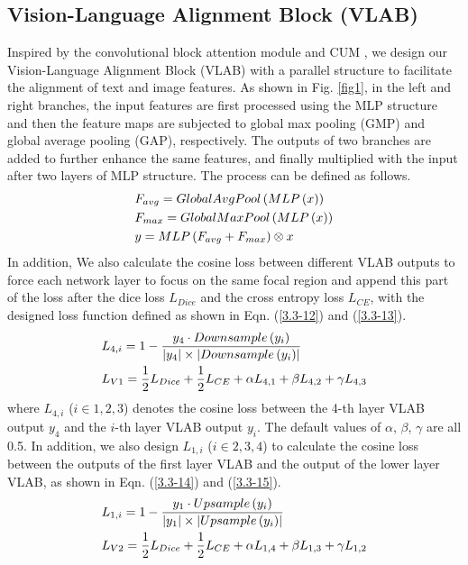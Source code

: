 \documentclass{article}
\begin{document}
\vspace{-5mm}
\subsection{Vision-Language Alignment Block (VLAB)}
\vspace{-2mm}
Inspired by the convolutional block attention module \cite{li2022tfcns} and CUM \cite{li2022semi}, we design our Vision-Language Alignment Block (VLAB) with a parallel structure to facilitate the alignment of text and image features. As shown in Fig. \ref{fig1}, in the left and right branches, the input features are first processed using the MLP structure and then the feature maps are subjected to global max pooling (GMP) and global average pooling (GAP), respectively. The outputs of two branches are added to further enhance the same features, and finally multiplied with the input after two layers of MLP structure. The process can be defined as follows.
\vspace{-2mm}
\begin{eqnarray}
\setlength{\abovedisplayskip}{0pt}
\setlength{\belowdisplayskip}{0pt}
& F_{avg}=GlobalAvgPool\left ( MLP\left (   x\right  )\right )\\
& F_{max}=GlobalMaxPool\left ( MLP\left (   x\right  )\right )\\
& y= MLP\left (F_{avg}+F_{max}\right )\otimes  x
\end{eqnarray}
In addition, We also calculate the cosine loss between different VLAB outputs to force each network layer to focus on the same focal region and append this part of the loss after the dice loss $L_{Dice}$ and the cross entropy loss $L_{CE}$, with the designed loss function defined as shown in Eqn. (\ref{3.3-12}) and (\ref{3.3-13}).
\vspace{-2mm}
\begin{eqnarray}
\setlength{\abovedisplayskip}{0pt}
\setlength{\belowdisplayskip}{0pt}
& L_{4,i}=1-\frac{y_{4}\cdot Downsample\left ( y_{i}\right ) }{\left | y_{4}\right |\times\left | Downsample\left ( y_{i}\right )\right | }\label{3.3-12}\\
& L_{V1}=\frac{1}{2}L_{Dice}+\frac{1}{2}L_{CE}+\alpha L_{4,1}+\beta L_{4,2}+\gamma L_{4,3}\label{3.3-13}
\end{eqnarray}
where $L_{4,i}$ ($i\in 1,2,3$) denotes the cosine loss between the 4-th layer VLAB output $y_{4}$ and the $i$-th layer VLAB output $y_{i}$. The default values of $\alpha$, $\beta$, $\gamma$ are all 0.5. In addition, we also design $L_{1,i}$ ($i\in 2,3,4$) to calculate the cosine loss between the outputs of the first layer VLAB and the output of the lower layer VLAB, as shown in Eqn. (\ref{3.3-14}) and (\ref{3.3-15}).
\vspace{-2mm}
\begin{eqnarray}
\setlength{\abovedisplayskip}{0pt}
\setlength{\belowdisplayskip}{0pt}
& L_{1,i}=1-\frac{y_{1}\cdot Upsample\left ( y_{i}\right ) }{\left | y_{1}\right |\times\left | Upsample\left ( y_{i}\right )\right | }\label{3.3-14}\\
& L_{V2}=\frac{1}{2}L_{Dice}+\frac{1}{2}L_{CE}+\alpha L_{1,4}+\beta L_{1,3}+\gamma L_{1,2}\label{3.3-15}
\end{eqnarray}
\end{document}
